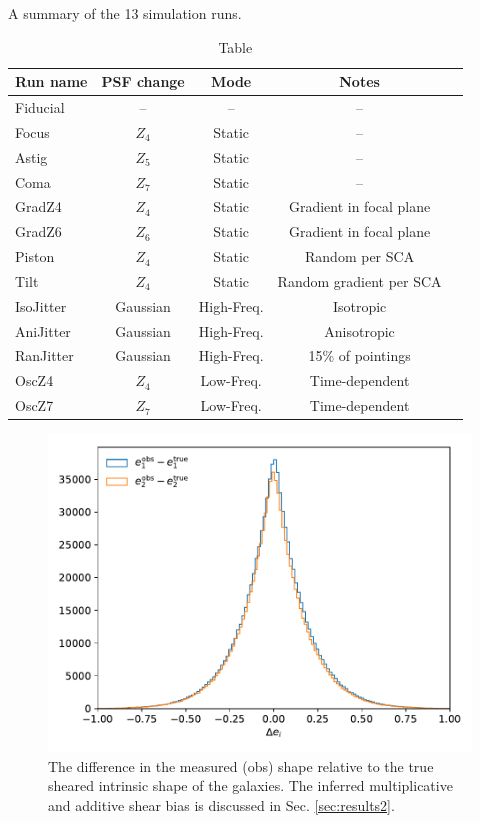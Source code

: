 \documentclass[aps,prd, amsmath,amssymb,superscriptaddress,showkeys,nofootinbib,reprint,preprintnumbers]{revtex4-1}
\begin{document}
\def\arraystretch{1.4}
\setlength{\tabcolsep}{4pt}
\begin{table}
\caption{Table} A summary of the 13 simulation runs.
\label{table:runs}
\begin{center}
\begin{tabular}{lcccc }
\hline
\hline
Run name & PSF change & Mode & Notes \\ 
\hline
Fiducial              & -- & -- & -- \\
Focus                & $Z_4$ & Static & --  \\
Astig                  & $Z_5$ & Static &  -- \\
Coma                & $Z_7$ & Static &  -- \\
GradZ4             & $Z_4$ & Static & Gradient in focal plane  \\
GradZ6              & $Z_6$ & Static &Gradient in focal plane    \\
Piston 		 & $Z_4$ & Static  &Random per SCA   \\
Tilt 			 & $Z_4$ & Static & Random gradient per SCA \\
IsoJitter 		& Gaussian  & High-Freq. & Isotropic  \\
AniJitter 		 & Gaussian & High-Freq. & Anisotropic  \\
RanJitter 		 & Gaussian & High-Freq. & 15\% of pointings  \\
OscZ4 		 & $Z_4$ & Low-Freq. & Time-dependent  \\
OscZ7 		 & $Z_7$ & Low-Freq. & Time-dependent  \\
\hline
\hline
\end{tabular}
\end{center}
\end{table}

\begin{figure}
\begin{center}
\includegraphics[width=\columnwidth]{figures/shape_hist.pdf}
\end{center}
\caption[]{
The difference in the measured (obs) shape relative to the true sheared intrinsic shape of the galaxies. The inferred multiplicative and additive shear bias is discussed in Sec. \ref{sec:results2}. 
\label{fig:shape_hist}}
\end{figure}
\end{document}
